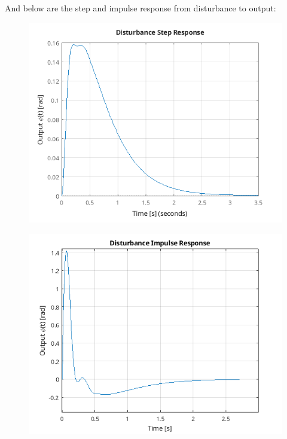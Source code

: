 \documentclass{article}
\begin{document}
And below are the step and impulse response from disturbance to output:

\begin{figure}[H]
    \centering
    \includegraphics[width=\textwidth]{step125.png}
\end{figure}

\begin{figure}[H]
    \centering
    \includegraphics[width=\textwidth]{impulse125.png}
\end{figure}
\end{document}
